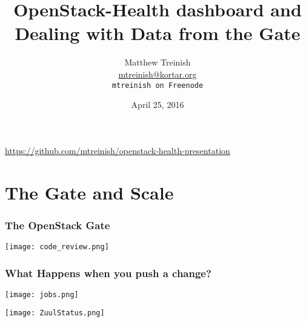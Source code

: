 \documentclass[aspectratio=169,11pt,hyperref={colorlinks=true}]{beamer}
\author[Matthew Treinish]{%
    \texorpdfstring{%
        \centering
        Matthew Treinish\\
        \href{mailto:mtreinish@kortar.org}{mtreinish@kortar.org}\\
        \texttt{mtreinish on Freenode}
   }
   {Matthew Treinish}
}
\date{April 25, 2016}
\title[OpenStack-Health dashboard and Dealing with Data from the Gate
\hspace{2em}\insertframenumber/\inserttotalframenumber]{OpenStack-Health dashboard and Dealing with Data from the Gate}
\begin{document}
{%
\begin{frame}[noframenumbering]
    \hypersetup{colorlinks,urlcolor=white}
    \titlepage{}
    \centering
    \href{https://github.com/mtreinish/openstack-health-presentation}{https://github.com/mtreinish/openstack-health-presentation}
\end{frame}
}

\section{The Gate and Scale}
\begin{frame}
    \frametitle{The OpenStack Gate}
	\begin{center}
		\texttt{[image: code\_review.png]}
	\end{center}
\end{frame}

\begin{frame}
\frametitle{What Happens when you push a change?}
\begin{center}
	\texttt{[image: jobs.png]}
\end{center}
\end{frame}

\begin{frame}
\begin{center}
    \texttt{[image: ZuulStatus.png]}
\end{center}
\end{frame}
\end{document}
